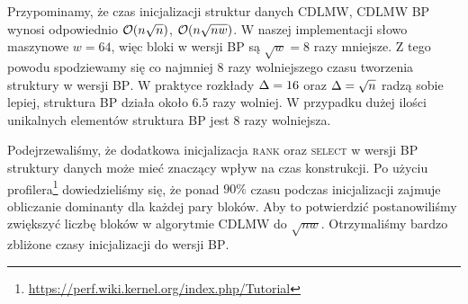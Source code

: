 Przypominamy, że czas inicjalizacji struktur danych \textsc{CDLMW}, \textsc{CDLMW BP} wynosi odpowiednio $\mathcal{O}(n\sqrt{n})$, $\mathcal{O}(n\sqrt{nw})$. W naszej implementacji słowo maszynowe $w = 64$, więc bloki w wersji \textsc{BP} są $\sqrt{w}=8$ razy mniejsze. Z tego powodu spodziewamy się co najmniej $8$ razy wolniejszego czasu tworzenia struktury w wersji \textsc{BP}. W praktyce rozkłady $\Delta=16$ oraz $\Delta=\sqrt{n}$ radzą sobie lepiej, struktura \textsc{BP} działa około 6.5 razy wolniej. W przypadku dużej ilości unikalnych elementów struktura \textsc{BP} jest 8 razy wolniejsza.

Podejrzewaliśmy, że dodatkowa inicjalizacja \textsc{rank} oraz \textsc{select} w wersji \textsc{BP} struktury danych może mieć znaczący wpływ na czas konstrukcji. Po użyciu profilera\footnote{\url{https://perf.wiki.kernel.org/index.php/Tutorial}} dowiedzieliśmy się, że ponad $90\%$ czasu podczas inicjalizacji zajmuje obliczanie dominanty dla każdej pary bloków. Aby to potwierdzić postanowiliśmy zwiększyć liczbę bloków w algorytmie \textsc{CDLMW} do $\sqrt{nw}$. Otrzymaliśmy bardzo zbliżone czasy inicjalizacji do wersji \textsc{BP}.\vspace{-1.5em}
